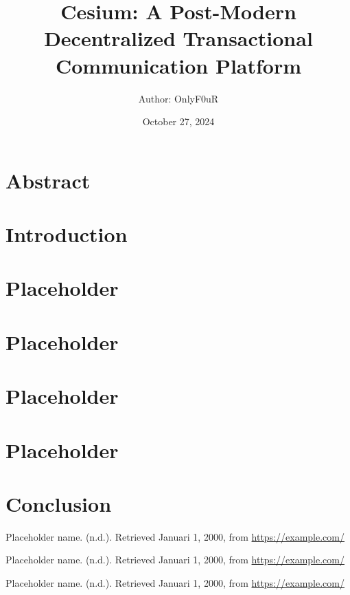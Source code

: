 \documentclass[12px, letterpaper]{article}
\title{Cesium: A Post-Modern Decentralized Transactional Communication Platform}
\author{\normalsize Author: OnlyF0uR\\\normalsize}
\date {\color{black} October 27, 2024}
\begin{document}
\maketitle

\section{Abstract}

\lipsum[1]

\section{Introduction}

\lipsum[1-2]

\section{Placeholder}

\lipsum[1-4]

\section{Placeholder}
    
\lipsum[1-2]
    
\section{Placeholder}

\lipsum[1] 

\section{Placeholder}

\lipsum[1-3]

\section{Conclusion}

\lipsum[1-2]
    
\begin{thebibliography}{}

	 Placeholder name. (n.d.). Retrieved Januari 1, 2000, from  \url{https://example.com/}

     Placeholder name. (n.d.). Retrieved Januari 1, 2000, from  \url{https://example.com/}

     Placeholder name. (n.d.). Retrieved Januari 1, 2000, from  \url{https://example.com/}

\end{thebibliography}
\end{document}
